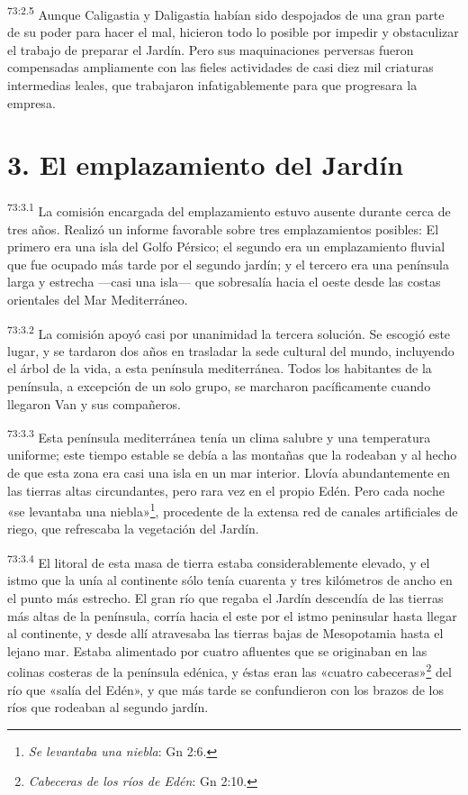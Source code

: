 \par
\textsuperscript{73:2.5} Aunque Caligastia y Daligastia habían sido despojados de una gran parte de su poder para hacer el mal, hicieron todo lo posible por impedir y obstaculizar el trabajo de preparar el Jardín. Pero sus maquinaciones perversas fueron compensadas ampliamente con las fieles actividades de casi diez mil criaturas intermedias leales, que trabajaron infatigablemente para que progresara la empresa.

\section*{3. El emplazamiento del Jardín}
\par
\textsuperscript{73:3.1} La comisión encargada del emplazamiento estuvo ausente durante cerca de tres años. Realizó un informe favorable sobre tres emplazamientos posibles: El primero era una isla del Golfo Pérsico; el segundo era un emplazamiento fluvial que fue ocupado más tarde por el segundo jardín; y el tercero era una península larga y estrecha ---casi una isla--- que sobresalía hacia el oeste desde las costas orientales del Mar Mediterráneo.

\par
\textsuperscript{73:3.2} La comisión apoyó casi por unanimidad la tercera solución. Se escogió este lugar, y se tardaron dos años en trasladar la sede cultural del mundo, incluyendo el árbol de la vida, a esta península mediterránea. Todos los habitantes de la península, a excepción de un solo grupo, se marcharon pacíficamente cuando llegaron Van y sus compañeros.

\par
\textsuperscript{73:3.3} Esta península mediterránea tenía un clima salubre y una temperatura uniforme; este tiempo estable se debía a las montañas que la rodeaban y al hecho de que esta zona era casi una isla en un mar interior. Llovía abundantemente en las tierras altas circundantes, pero rara vez en el propio Edén. Pero cada noche «se levantaba una niebla»\footnote{\textit{Se levantaba una niebla}: Gn 2:6.}, procedente de la extensa red de canales artificiales de riego, que refrescaba la vegetación del Jardín.

\par
\textsuperscript{73:3.4} El litoral de esta masa de tierra estaba considerablemente elevado, y el istmo que la unía al continente sólo tenía cuarenta y tres kilómetros de ancho en el punto más estrecho. El gran río que regaba el Jardín descendía de las tierras más altas de la península, corría hacia el este por el istmo peninsular hasta llegar al continente, y desde allí atravesaba las tierras bajas de Mesopotamia hasta el lejano mar. Estaba alimentado por cuatro afluentes que se originaban en las colinas costeras de la península edénica, y éstas eran las «cuatro cabeceras»\footnote{\textit{Cabeceras de los ríos de Edén}: Gn 2:10.} del río que «salía del Edén», y que más tarde se confundieron con los brazos de los ríos que rodeaban al segundo jardín.


